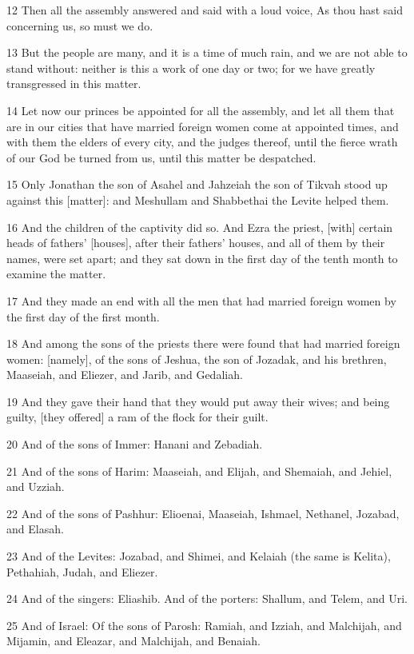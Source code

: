 \par 12 Then all the assembly answered and said with a loud voice, As thou hast said concerning us, so must we do.
\par 13 But the people are many, and it is a time of much rain, and we are not able to stand without: neither is this a work of one day or two; for we have greatly transgressed in this matter.
\par 14 Let now our princes be appointed for all the assembly, and let all them that are in our cities that have married foreign women come at appointed times, and with them the elders of every city, and the judges thereof, until the fierce wrath of our God be turned from us, until this matter be despatched.
\par 15 Only Jonathan the son of Asahel and Jahzeiah the son of Tikvah stood up against this [matter]: and Meshullam and Shabbethai the Levite helped them.
\par 16 And the children of the captivity did so. And Ezra the priest, [with] certain heads of fathers' [houses], after their fathers' houses, and all of them by their names, were set apart; and they sat down in the first day of the tenth month to examine the matter.
\par 17 And they made an end with all the men that had married foreign women by the first day of the first month.
\par 18 And among the sons of the priests there were found that had married foreign women: [namely], of the sons of Jeshua, the son of Jozadak, and his brethren, Maaseiah, and Eliezer, and Jarib, and Gedaliah.
\par 19 And they gave their hand that they would put away their wives; and being guilty, [they offered] a ram of the flock for their guilt.
\par 20 And of the sons of Immer: Hanani and Zebadiah.
\par 21 And of the sons of Harim: Maaseiah, and Elijah, and Shemaiah, and Jehiel, and Uzziah.
\par 22 And of the sons of Pashhur: Elioenai, Maaseiah, Ishmael, Nethanel, Jozabad, and Elasah.
\par 23 And of the Levites: Jozabad, and Shimei, and Kelaiah (the same is Kelita), Pethahiah, Judah, and Eliezer.
\par 24 And of the singers: Eliashib. And of the porters: Shallum, and Telem, and Uri.
\par 25 And of Israel: Of the sons of Parosh: Ramiah, and Izziah, and Malchijah, and Mijamin, and Eleazar, and Malchijah, and Benaiah.
